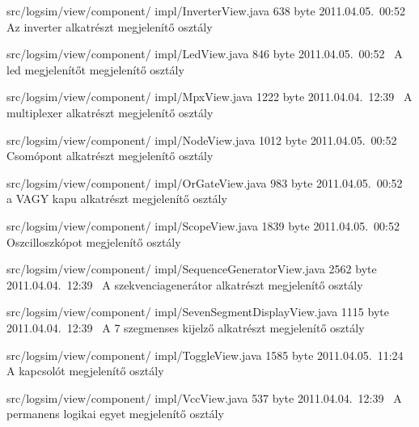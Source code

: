 \begin{fajllista}
\fajl
{src/logsim/view/component/\newline
impl/InverterView.java} %
{638 byte} %
{2011.04.05.~00:52~} %
{Az inverter alkatrészt megjelenítő osztály} %

\fajl
{src/logsim/view/component/\newline
impl/LedView.java} %
{846 byte} %
{2011.04.05.~00:52~} %
{A led megjelenítőt megjelenítő osztály} %

\fajl
{src/logsim/view/component/\newline
impl/MpxView.java} %
{1222 byte} %
{2011.04.04.~12:39~} %
{A multiplexer alkatrészt megjelenítő osztály} %

\fajl
{src/logsim/view/component/\newline
impl/NodeView.java} %
{1012 byte} %
{2011.04.05.~00:52~} %
{Csomópont alkatrészt megjelenítő osztály} %

\fajl
{src/logsim/view/component/\newline
impl/OrGateView.java} %
{983 byte} %
{2011.04.05.~00:52~} %
{a VAGY kapu alkatrészt megjelenítő osztály} %

\fajl
{src/logsim/view/component/\newline
impl/ScopeView.java} %
{1839 byte} %
{2011.04.05.~00:52~} %
{Oszcilloszkópot megjelenítő osztály} %

\fajl
{src/logsim/view/component/\newline
impl/SequenceGeneratorView.java} %
{2562 byte} %
{2011.04.04.~12:39~} %
{A szekvenciagenerátor alkatrészt megjelenítő osztály} %

\fajl
{src/logsim/view/component/\newline
impl/SevenSegmentDisplayView.java} %
{1115 byte} %
{2011.04.04.~12:39~} %
{A 7 szegmenses kijelző alkatrészt megjelenítő osztály} %

\fajl
{src/logsim/view/component/\newline
impl/ToggleView.java} %
{1585 byte} %
{2011.04.05.~11:24~} %
{A kapcsolót megjelenítő osztály} %

\fajl
{src/logsim/view/component/\newline
impl/VccView.java} %
{537 byte} %
{2011.04.04.~12:39~} %
{A permanens logikai egyet megjelenítő osztály} %


\end{fajllista}
